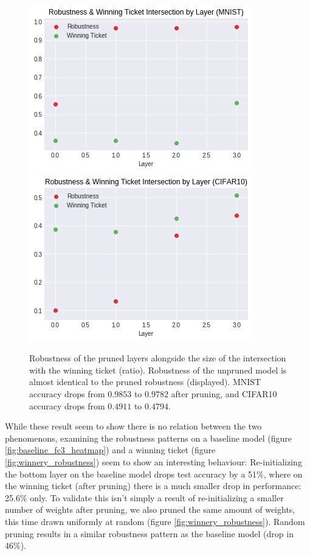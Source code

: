 \documentclass{article}
\begin{document}
\begin{figure}
  \includegraphics[width=\linewidth]{images/mnist_fc3_robustness_winnery_correlation.png}
  \label{fig:winnery_robustness_correlation}
  \includegraphics[width=\linewidth]{images/cifar10_fc3_robustness_winnery_correlation.png}
    \caption{Robustness of the pruned layers alongside the size of the intersection with the winning ticket (ratio). Robustness of the unpruned model is almost identical to the pruned robustness (displayed). MNIST accuracy drops from $0.9853$ to $0.9782$ after pruning, and CIFAR10 accuracy drops from $0.4911$ to $0.4794$.}
\end{figure}
While these result seem to show there is no relation between the two phenomenons, examining the robustness patterns on a baseline model (figure \ref{fig:baseline_fc3_heatmap}) and a winning ticket (figure \ref{fig:winnery_robustness}) seem to show an interesting behaviour: Re-initializing the bottom layer on the baseline model drops test accuracy by a 51\%, where on the winning ticket (after pruning) there is a much smaller drop in performance: 25.6\% only. To validate this isn't simply a result of re-initializing a smaller number of weights after pruning, we also pruned the same amount of weights, this time drawn uniformly at random (figure \ref{fig:winnery_robustness}). Random pruning results in a similar robustness pattern as the baseline model (drop in 46\%).\\
\end{document}
